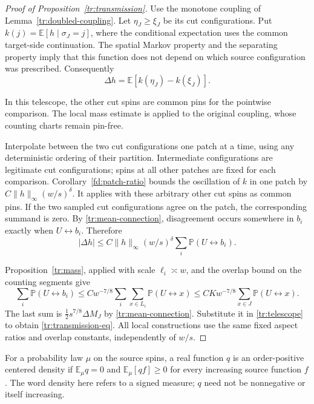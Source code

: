 \begin{proof}[Proof of Proposition~\ref{tr:transmission}]
Use the monotone coupling of Lemma~\ref{tr:doubled-coupling}. Let
$\eta_J\geq\xi_J$ be its cut configurations. Put
$k(j)=\mathbb E[h\mid\sigma_J=j]$, where the conditional expectation
uses the common target-side continuation. The spatial Markov property
and the separating property imply that this function does not depend
on which source configuration was prescribed. Consequently
\[
 \Delta h=\mathbb E[k(\eta_J)-k(\xi_J)].
\]

In this telescope, the other cut spins are common pins for the pointwise
comparison. The local mass estimate is applied to the original coupling,
whose counting charts remain pin-free.

Interpolate between the two cut configurations one patch at a time,
using any deterministic ordering of their partition. Intermediate
configurations are legitimate cut configurations; spins at all other
patches are fixed for each comparison. Corollary~\ref{fd:patch-ratio}
bounds the oscillation of $k$ in one patch by
$C\|h\|_\infty(w/s)^\delta$. It applies with these arbitrary other cut
spins as common pins. If the two sampled cut configurations agree on
the patch, the corresponding summand is zero. By
\eqref{tr:mean-connection}, disagreement occurs somewhere in $b_i$
exactly when $U\longleftrightarrow b_i$. Therefore
\begin{equation}
\label{tr:telescope}
 |\Delta h|\leq C\|h\|_\infty(w/s)^\delta
 \sum_i\mathbb P(U\longleftrightarrow b_i).
\end{equation}

Proposition~\ref{tr:mass}, applied with scale $\ell_i\asymp w$, and the
overlap bound on the counting segments give
\[
 \sum_i\mathbb P(U\longleftrightarrow b_i)
 \leq C w^{-7/8}\sum_i\sum_{x\in L_i}
               \mathbb P(U\longleftrightarrow x)
 \leq C K w^{-7/8}\sum_{x\in J}
               \mathbb P(U\longleftrightarrow x).
\]
The last sum is $\tfrac12s^{7/8}\Delta M_J$ by
\eqref{tr:mean-connection}. Substitute it in \eqref{tr:telescope} to
obtain \eqref{tr:transmission-eq}. All local constructions use the same
fixed aspect ratios and overlap constants, independently of $w/s$.
\end{proof}

\begin{definition}
\label{tr:order-positive}
For a probability law $\mu$ on the source spins, a real function $q$ is
an order-positive centered density if $\mathbb E_\mu q=0$ and
$\mathbb E_\mu[qf]\geq0$ for every increasing source function $f$.
The word density here refers to a signed measure; $q$ need not be
nonnegative or itself increasing.
\end{definition}

